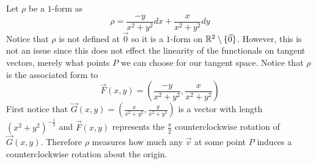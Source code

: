 \documentclass[notes.tex]{subfiles}
\begin{document}
\begin{example}
    Let $\rho$ be a $1$-form as
    \[
        \rho = \frac{-y}{x^2 + y^2}dx + \frac{x}{x^2 + y^2}dy
    \]
    Notice that $\rho$ is not defined at $\vec{0}$ so it is a $1$-form on $\mathbb{R}^2 \setminus \{ \vec{0} \}$. However, this is not an issue since this does not effect the linearity of the functionals on tangent vectors, merely what points $P$ we can choose for our tangent space. Notice that $\rho$ is the associated form to
    \[
        \vec{F}(x, y) = \left( \frac{-y}{x^2 + y^2}, \frac{x}{x^2 + y^2} \right)
    \]
    First notice that $\vec{G}(x, y) =\left( \frac{x}{x^2 + y^2}, \frac{y}{x^2 + y^2} \right)$ is a vector with length $(x^2 + y^2)^{-\frac{1}{2}}$ and $\vec{F}(x, y)$ represents the $\frac{\pi}{2}$ counterclockwise rotation of $\vec{G}(x, y)$. Therefore $\rho$ measures how much any $\vec{v}$ at some point $P$ induces a counterclockwise rotation about the origin.
\end{example}
\end{document}
